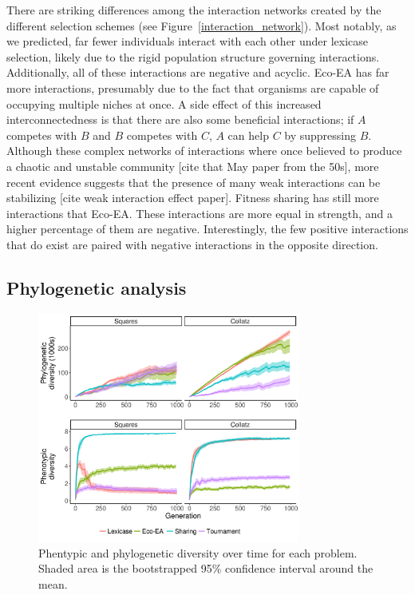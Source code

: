 There are striking differences among the interaction networks created by the different selection schemes (see Figure~\ref{interaction_network}). Most notably, as we predicted, far fewer individuals interact with each other under lexicase selection, likely due to the rigid population structure governing interactions. Additionally, all of these interactions are negative and acyclic. Eco-EA has far more interactions, presumably due to the fact that organisms are capable of occupying multiple niches at once. A side effect of this increased interconnectedness is that there are also some beneficial interactions; if $A$ competes with $B$ and $B$ competes with $C$, $A$ can help $C$ by suppressing $B$. Although these complex networks of interactions where once believed to produce a chaotic and unstable community [cite that May paper from the 50s], more recent evidence suggests that the presence of many weak interactions can be stabilizing [cite weak interaction effect paper]. Fitness sharing has still more interactions that Eco-EA. These interactions are more equal in strength, and a higher percentage of them are negative. Interestingly, the few positive interactions that do exist are paired with negative interactions in the opposite direction. 


\subsection{Phylogenetic analysis}

\begin{figure}
\includegraphics[width=3.4in]{figs/time_all.png}
\caption{Phentypic and phylogenetic diversity over time for each problem. Shaded area is the bootstrapped 95\% confidence interval around the mean.}
\label{phylo_results}
\end{figure}

